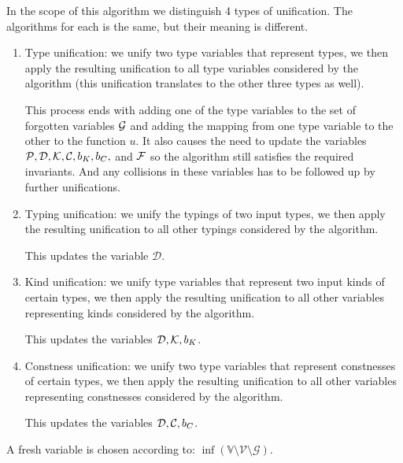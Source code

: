 \begin{defn}[Unifications]
    In the scope of this algorithm we distinguish 4 types of unification. The algorithms for each is the same, but their meaning is different.

    \begin{enumerate}
        \item Type unification: we unify two type variables that represent types, we then apply the resulting unification to all type variables considered by the algorithm (this unification translates to the other three types as well). \label{tUni}

        This process ends with adding one of the type variables to the set of forgotten variables $\mathcal G$ and adding the mapping from one type variable to the other to the function $u$. It also causes the need to update the variables $\mathcal P, \mathcal D, \mathcal K, \mathcal C, b_K, b_C,$ and $\mathcal F$ so the algorithm still satisfies the required invariants. And any collisions in these variables has to be followed up by further unifications.

        \item Typing unification: we unify the typings of two input types, we then apply the resulting unification to all other typings considered by the algorithm.  \label{tyUni}

        This updates the variable $\mathcal D$.

        \item Kind unification: we unify type variables that represent two input kinds of certain types, we then apply the resulting unification to all other variables representing kinds considered by the algorithm. \label{kUni}

        This updates the variables $\mathcal D, \mathcal K, b_K$.

        \item Constness unification: we unify two type variables that represent constnesses of certain types, we then apply the resulting unification to all other variables representing constnesses considered by the algorithm. \label{cUni}

        This updates the variables $\mathcal D, \mathcal C, b_C$.
    \end{enumerate}
\end{defn}

\begin{defn}
    \label{freshVar}
    A fresh variable is chosen according to: \linebreak $\inf \left(\mathbb{V} \setminus \mathcal{V} \setminus \mathcal{G}\right)$.
\end{defn}

